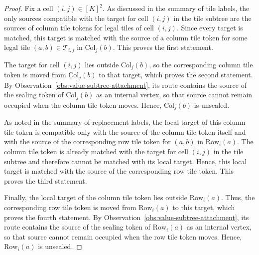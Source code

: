 \documentclass[a4paper,USenglish,thm-restate]{lipics-v2021}
\newcommand{\rowsub}{\mathrm{Row}}
\newcommand{\colsub}{\mathrm{Col}}
\theoremstyle{problemstyle}
\begin{document}
\begin{proof}
Fix a cell $(i,j)\in[K]^2$. As discussed in the summary of tile labels, the only sources compatible with the target for cell $(i,j)$ in the tile subtree are the sources of column tile tokens for legal tiles of cell $(i,j)$. Since every target is matched, this target is matched with the source of a column tile token for some legal tile $(a,b)\in \mathcal{T}_{i,j}$ in $\colsub_j(b)$. This proves the first statement.

The target for cell $(i,j)$ lies outside $\colsub_j(b)$, so the corresponding column tile token is moved from $\colsub_j(b)$ to that target, which proves the second statement. By Observation~\ref{obs:value-subtree-attachment}, its route contains the source of the sealing token of $\colsub_j(b)$ as an internal vertex, so that source cannot remain occupied when the column tile token moves. Hence, $\colsub_j(b)$ is unsealed.

As noted in the summary of replacement labels, the local target of this column tile token is compatible only with the source of the column tile token itself and with the source of the corresponding row tile token for $(a,b)$ in $\rowsub_i(a)$. The column tile token is already matched with the target for cell $(i,j)$ in the tile subtree and therefore cannot be matched with its local target. Hence, this local target is matched with the source of the corresponding row tile token. This proves the third statement.

Finally, the local target of the column tile token lies outside $\rowsub_i(a)$. Thus, the corresponding row tile token is moved from $\rowsub_i(a)$ to this target, which proves the fourth statement. By Observation~\ref{obs:value-subtree-attachment}, its route contains the source of the sealing token of $\rowsub_i(a)$ as an internal vertex, so that source cannot remain occupied when the row tile token moves. Hence, $\rowsub_i(a)$ is unsealed.
\end{proof}
\end{document}
